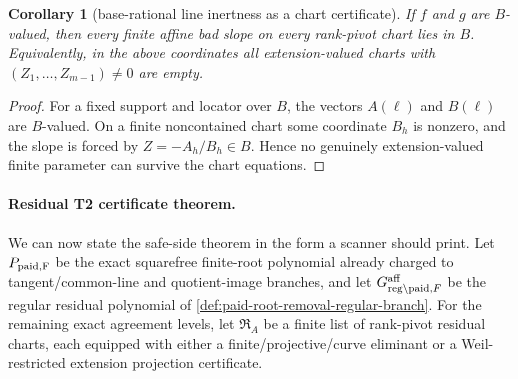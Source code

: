 \documentclass[11pt]{article}
\newtheorem{corollary}[theorem]{Corollary}
\theoremstyle{definition}
\theoremstyle{remark}
\newcommand{\B}{B}
\begin{document}
\begin{corollary}[base-rational line inertness as a chart certificate]
\label{cor:base-rational-line-inertness-chart}
If $f$ and $g$ are $\B$-valued, then every finite affine bad slope on every
rank-pivot chart lies in $\B$.  Equivalently, in the above coordinates all
extension-valued charts with $(Z_1,\ldots,Z_{m-1})\ne0$ are empty.
\end{corollary}

\begin{proof}
For a fixed support and locator over $\B$, the vectors $A(\ell)$ and $B(\ell)$
are $\B$-valued.  On a finite noncontained chart some coordinate $B_h$ is
nonzero, and the slope is forced by
$Z=-A_h/B_h\in\B$.  Hence no genuinely extension-valued finite parameter can
survive the chart equations.
\end{proof}

\paragraph{Residual T2 certificate theorem.}
We can now state the safe-side theorem in the form a scanner should print.  Let
$P_{\rm paid,F}$ be the exact squarefree finite-root polynomial already charged
to tangent/common-line and quotient-image branches, and let
$G_{{\rm reg}\setminus{\rm paid},F}^{\rm aff}$ be the regular residual polynomial
of \cref{def:paid-root-removal-regular-branch}.  For the remaining exact
agreement levels, let $\mathfrak R_A$ be a finite list of rank-pivot residual
charts, each equipped with either a finite/projective/curve eliminant or a
Weil-restricted extension projection certificate.
\end{document}
